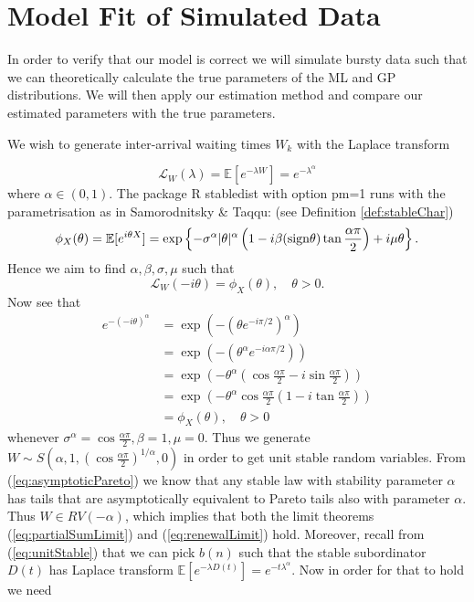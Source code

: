 \documentclass[honours,12pt,twoside, openright]{unswthesis}
\newcommand{\E}{\mathbb{E}}
\newcommand{\1}{\mathbf 1}
\numberwithin{equation}{section}
\theoremstyle{definition}
\theoremstyle{remark}
\begin{document}
\section{Model Fit of Simulated Data}
In order to verify that our model is correct we will simulate bursty data such that we can theoretically calculate the true parameters of the ML and GP distributions. We will then apply our estimation method and compare our estimated parameters with the true parameters.

We wish to generate inter-arrival waiting times $W_k$ with the Laplace transform

$$\mathcal L_W(\lambda) = \E [e^{-\lambda W}] = e^{-\lambda^\alpha}$$ 
where $\alpha \in (0,1)$. 
The package R stabledist with option pm=1 runs with the parametrisation
as in Samorodnitsky \& Taqqu: (see Definition \ref{def:stableChar})
\begin{align*}
\phi_X (\theta) = \E[ e^{i\theta X}] = \exp \left\lbrace -\sigma^\alpha |\theta|^\alpha \left(1 - i\beta({\rm sign} \theta) \tan \frac{\alpha \pi}{2}\right) + i \mu \theta \right\rbrace.
\end{align*}
Hence we aim to find $\alpha, \beta, \sigma, \mu$ such that 
$$\mathcal L_W(-i\theta) = \phi_X(\theta), \quad \theta > 0.$$
Now see that 
\begin{align*}
e^{-(-i\theta)^\alpha}
&= \exp\left(-(\theta e^{-i \pi / 2})^\alpha\right)\\
&= \exp\left(-\left(\theta^\alpha e^{-i\alpha \pi/2}\right)\right)\\
&= \exp\left(-\theta^\alpha\left(\cos \frac{\alpha\pi}{2} - i \sin\frac{\alpha\pi}{2}\right)\right)
\\
&= \exp\left(-\theta^\alpha \cos\frac{\alpha\pi}{2}\left(1 - i \tan \frac{\alpha\pi}{2}\right)\right)\\
&=  \phi_X(\theta), \quad \theta > 0
\end{align*}
whenever $\sigma^\alpha = \cos\frac{\alpha\pi}{2}, \beta = 1, \mu = 0$. Thus we generate $W\sim S(\alpha,1,(\cos\frac{\alpha\pi}{2})^{1/\alpha},0)$ in order to get unit stable random variables. From (\ref{eq:asymptoticPareto}) we know that any stable law with stability parameter $\alpha$ has tails that are asymptotically equivalent to Pareto tails also with parameter $\alpha$. Thus $W\in RV(-\alpha)$, which implies that both the limit theorems (\ref{eq:partialSumLimit}) and (\ref{eq:renewalLimit}) hold. Moreover, recall from (\ref{eq:unitStable}) that we can pick $b(n)$ such that the stable subordinator $D(t)$ has Laplace transform $\E[e^{-\lambda D(t)}] = e^{-t \lambda^\alpha}$. Now in order for that to hold we need 
\end{document}
